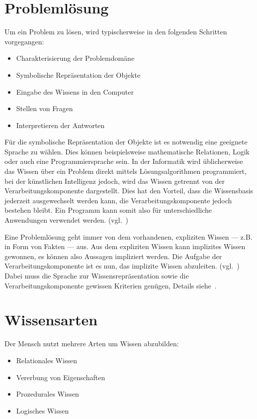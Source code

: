 \newpage

\section{Problemlösung}
\label{sec:experten_systeme_problemloesung}
Um ein Problem zu lösen, wird typischerweise in den folgenden Schritten vorgegangen:
\begin{itemize}
    \item Charakterisierung der Problemdomäne
    \item Symbolische Repräsentation der Objekte
    \item Eingabe des Wissens in den Computer
    \item Stellen von Fragen
    \item Interpretieren der Antworten
\end{itemize}

Für die symbolische Repräsentation der Objekte ist es notwendig eine geeignete Sprache zu wählen. Dies können beispielsweise mathematische Relationen, Logik oder auch eine Programmiersprache sein. In der Informatik wird üblicherweise das Wissen über ein Problem direkt mittels Lösungsalgorithmen programmiert, bei der künstlichen Intelligenz jedoch, wird das Wissen getrennt von der Verarbeitungskomponente dargestellt. Dies hat den Vorteil, dass die Wissensbasis jederzeit ausgewechselt werden kann, die Verarbeitungskomponente jedoch bestehen bleibt. Ein Programm kann somit also für unterschiedliche Anwendungen verwendet werden. (vgl.~\cite[S. 28 - 30]{laemmel})

Eine Problemlösung geht immer von dem vorhandenen, expliziten Wissen --- z.B. in Form von Fakten --- aus. Aus dem expliziten Wissen kann implizites Wissen gewonnen, es können also Aussagen impliziert werden. Die Aufgabe der Verarbeitungskomponente ist es nun, das implizite Wissen abzuleiten. (vgl.~\cite[S. 30 - 31]{laemmel}) Dabei muss die Sprache zur Wissensrepräsentation sowie die Verarbeitungskomponente gewissen Kriterien genügen, Details siehe~\cite[S. 31]{laemmel}.

\section{Wissensarten}
\label{sec:experten_systeme_wissensarten}
Der Mensch nutzt mehrere Arten um Wissen abzubilden:
\begin{itemize}
    \item Relationales Wissen
    \item Vererbung von Eigenschaften
    \item Prozedurales Wissen
    \item Logisches Wissen
\end{itemize}
\label{itm:wissensarten}

